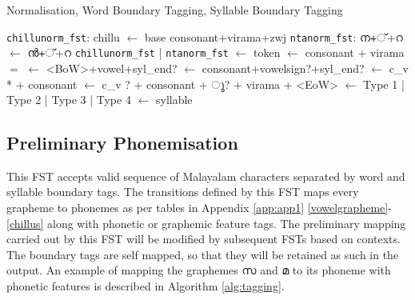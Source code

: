 \begin{algorithm}[htpb]
	\caption{Normalisation, Word Boundary Tagging, Syllable Boundary Tagging}\label{alg:syllabifier}
	\begin{algorithmic}[1]
		\State \texttt{chillunorm\_fst}: {\ipa chillu} $\gets$ {\ipa base consonant+virama+zwj} 
		\State \texttt{ntanorm\_fst}: {\mal ന+്+റ} $\gets$ {\mal ൻ+്+റ}
		\State \Return \texttt{chillunorm\_fst} {\ipa  | } \texttt{ntanorm\_fst} 
	\EndProcedure
		\State {} $\gets$ {\ipa token} 
	\EndProcedure
 		 $\gets$ {\ipa consonant + virama}
   		 $=$ {}  
        \State {}
		 $\gets$ {\ipa <BoW>+vowel+syl\_end?}  
		 $\gets$ {\ipa consonant+vowelsign?+syl\_end?}
		 $\gets$ {\ipa c\_v * + consonant} 
		 $\gets$ {\ipa c\_v ? + consonant + {\mal ു}? + virama + <EoW>}
		 $\gets$ {\ipa Type 1 | Type 2 | Type 3 | Type 4 } 
		\State {} $\gets$ {\ipa syllable} 
	\EndProcedure
	\end{algorithmic}
\end{algorithm}



\subsection{Preliminary Phonemisation}

This FST accepts valid sequence of Malayalam characters separated by word and
syllable boundary tags. The transitions defined by this FST maps every grapheme
to phonemes as per tables in Appendix \ref{app:app1} \ref{vowelgrapheme}-\ref{chillus} along with phonetic
or graphemic feature tags.
The preliminary mapping carried out by this FST will be modified by subsequent
FSTs based on contexts. The boundary tags are self mapped, so that they will be
retained as such in the output. An example of mapping the graphemes {\mal സ}
and {\mal മ} to its phoneme with phonetic features is described in Algorithm
\ref{alg:tagging}.

